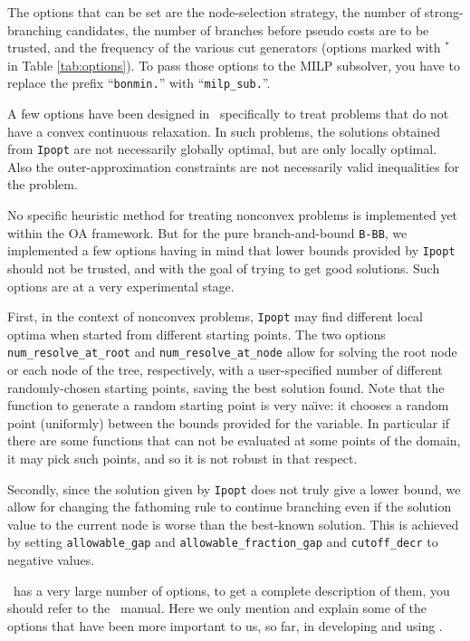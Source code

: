 The options that can be set are the node-selection strategy, the number of strong-branching candidates,
the number of branches before pseudo costs are to be trusted, and the frequency of the various cut generators
(options marked with $^*$ in Table \ref{tab:options}). To pass those options to the MILP subsolver, you have
to replace the prefix ``{\tt bonmin.}'' with ``{\tt milp\_sub.}''.


\label{sec:non_convex}
A few options have been designed in \Bonmin\ specifically to treat
problems that do not have a convex continuous relaxation.
In such problems, the solutions obtained from {\tt Ipopt} are
not necessarily globally optimal, but are only locally optimal. Also the outer-approximation
constraints are not necessarily valid inequalities for the problem.

No specific heuristic method for treating nonconvex problems is implemented
yet within the OA framework.
But for the pure branch-and-bound {\tt B-BB}, we implemented a few options having
in mind that lower bounds provided by {\tt Ipopt} should not be trusted, and with the goal of
trying to get good solutions. Such options are at a very experimental stage.

First, in the context of nonconvex problems, {\tt Ipopt} may find different local optima when started
from different starting points. The two options {\tt num\_re\-solve\_at\_root} and {\tt num\_resolve\_at\_node}
allow for solving the root node or each node of the tree, respectively, with a user-specified
number of different randomly-chosen
starting points, saving the best solution found. Note that the function to generate a random starting point
is very na\"{\i}ve: it chooses a random point (uniformly) between the bounds provided for the variable.
In particular if there are some functions
that can not be evaluated at some points of the domain, it may pick such points,
 and so it is not robust in that respect.

Secondly, since the solution given by {\tt Ipopt} does not truly give a lower bound, we allow for
changing the fathoming rule
to continue branching even if the solution value to the current node is worse
than the best-known
solution. This is achieved by setting {\tt allowable\_gap}
and {\tt allowable\_fraction\_gap} and {\tt cutoff\_decr} to negative values.

\Ipopt\ has a very large number of options, to get a complete description of them, you
should refer to the \Ipopt\ manual.
Here we only mention and explain some of the options that have been more important to us, so far,
in developing and using \Bonmin.
